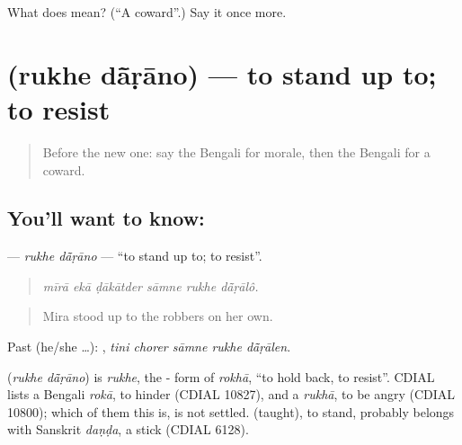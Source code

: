 \begin{tcolorbox}[breakable,colback=teal!4,colframe=teal!35!black,title={Before you move on}]
What does  mean? (\textquotedblleft{}A coward\textquotedblright{}.) Say it once more.
\end{tcolorbox}
\section[\texorpdfstring{\bn{রুখে} \bn{দাঁড়ানো} (rukhe dā̃ṛāno)}{রুখে দাঁড়ানো (rukhe dā̃ṛāno)}]{  (rukhe dā̃ṛāno) — to stand up to; to resist}

\label{lesson:BN-C453-rukhe-darano}



\begin{quote}
Before the new one: say the Bengali for morale, then the Bengali for a coward.
\end{quote}

\subsection*{You'll want to know:  }
\textbf{ } — \emph{rukhe dā̃ṛāno} — \textquotedblleft{}to stand up to; to resist\textquotedblright{}.

\begin{quote}
     
\end{quote}

\begin{quote}
\emph{mīrā ekā ḍākātder sāmne rukhe dā̃ṛālô.}
\end{quote}

\begin{quote}
Mira stood up to the robbers on her own.
\end{quote}

Past (he/she …):     , \emph{tini chorer sāmne rukhe dā̃ṛālen}.

\begin{cousinweb}
\textbf{ } (\emph{rukhe dā̃ṛāno}) is \emph{rukhe}, the - form of \emph{rokhā}, \textquotedblleft{}to hold back, to resist\textquotedblright{}. CDIAL lists a Bengali \emph{rokā}, to hinder (CDIAL 10827), and a \emph{rukhā}, to be angry (CDIAL 10800); which of them this is, is not settled.  (taught), to stand, probably belongs with Sanskrit \emph{daṇḍa}, a stick (CDIAL 6128).
\end{cousinweb}

